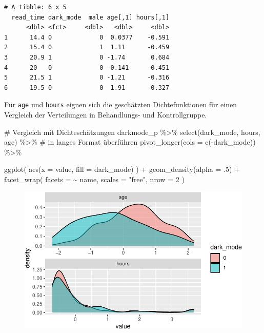 \documentclass[
  a4paper,
  DIV=11,
  oneside]{scrreprt}
\newenvironment{Shaded}{\begin{snugshade}}{\end{snugshade}}
\newcommand{\AttributeTok}[1]{\textcolor[rgb]{0.40,0.45,0.13}{#1}}
\newcommand{\CommentTok}[1]{\textcolor[rgb]{0.37,0.37,0.37}{#1}}
\newcommand{\DecValTok}[1]{\textcolor[rgb]{0.68,0.00,0.00}{#1}}
\newcommand{\FunctionTok}[1]{\textcolor[rgb]{0.28,0.35,0.67}{#1}}
\newcommand{\NormalTok}[1]{\textcolor[rgb]{0.00,0.23,0.31}{#1}}
\newcommand{\SpecialCharTok}[1]{\textcolor[rgb]{0.37,0.37,0.37}{#1}}
\newcommand{\StringTok}[1]{\textcolor[rgb]{0.13,0.47,0.30}{#1}}
\begin{document}
\begin{verbatim}
# A tibble: 6 x 5
  read_time dark_mode  male age[,1] hours[,1]
      <dbl> <fct>     <dbl>   <dbl>     <dbl>
1      14.4 0             0  0.0377    -0.591
2      15.4 0             1  1.11      -0.459
3      20.9 1             0 -1.74       0.684
4      20   0             0 -0.141     -0.451
5      21.5 1             0 -1.21      -0.316
6      19.5 0             0  1.91      -0.327
\end{verbatim}

Für \texttt{age} und \texttt{hours} eignen sich die geschätzten
Dichtefunktionen für einen Vergleich der Verteilungen in Behandlungs-
und Kontrollgruppe.

\begin{Shaded}
\begin{Highlighting}[]
\CommentTok{\# Vergleich mit Dichteschätzungen}
\NormalTok{darkmode\_p }\SpecialCharTok{\%\textgreater{}\%}
  \FunctionTok{select}\NormalTok{(dark\_mode, hours, age) }\SpecialCharTok{\%\textgreater{}\%}
  \CommentTok{\# in langes Format überführen}
  \FunctionTok{pivot\_longer}\NormalTok{(}\AttributeTok{cols =} \FunctionTok{c}\NormalTok{(}\SpecialCharTok{{-}}\NormalTok{dark\_mode)) }\SpecialCharTok{\%\textgreater{}\%}
  
  \FunctionTok{ggplot}\NormalTok{(}
    \FunctionTok{aes}\NormalTok{(}\AttributeTok{x =}\NormalTok{ value, }\AttributeTok{fill =}\NormalTok{ dark\_mode)}
\NormalTok{    ) }\SpecialCharTok{+}
  \FunctionTok{geom\_density}\NormalTok{(}\AttributeTok{alpha =}\NormalTok{ .}\DecValTok{5}\NormalTok{) }\SpecialCharTok{+} 
  \FunctionTok{facet\_wrap}\NormalTok{(}
    \AttributeTok{facets =} \SpecialCharTok{\textasciitilde{}}\NormalTok{ name, }
    \AttributeTok{scales =} \StringTok{"free"}\NormalTok{, }
    \AttributeTok{nrow =} \DecValTok{2}
\NormalTok{    )}
\end{Highlighting}
\end{Shaded}

\begin{figure}[t]

{\centering \includegraphics{Matching_files/figure-pdf/unnamed-chunk-14-1.pdf}

}

\end{figure}
\end{document}
